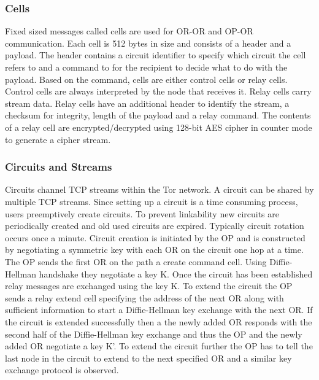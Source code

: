 \documentclass{llncs}
\begin{document}
\subsubsection{Cells}
Fixed sized messages called cells are used for OR-OR and OP-OR communication. Each cell is 512 bytes in size and consists of a header and a payload. The header contains a circuit identifier to specify which circuit the cell refers to and a command to for the recipient to decide what to do with the payload.
Based on the command, cells are either control cells or relay cells. Control cells are always interpreted by the node that receives it. Relay cells carry stream data. Relay cells have an additional header to identify the stream, a checksum for integrity, length of the payload and a relay command. The contents of a relay cell are encrypted/decrypted using 128-bit AES cipher in counter mode to generate a cipher stream.

\subsubsection{Circuits and Streams}
Circuits channel TCP streams within the Tor network. A circuit can be shared by multiple TCP streams. Since setting up a circuit is a time consuming process, users preemptively create circuits. To prevent linkability new circuits are periodically created and old used circuits are expired. Typically circuit rotation occurs once a minute. Circuit creation is initiated by the OP and is constructed by negotiating a symmetric key with each OR on the circuit one hop at a time. The OP sends the first OR on the path a create command cell. Using Diffie-Hellman handshake they negotiate a key K. Once the circuit has been established relay messages are exchanged using the key K. To extend the circuit the OP sends a relay extend cell specifying the address of the next OR along with sufficient information to start a Diffie-Hellman key exchange with the next OR. If the circuit is extended successfully then a the newly added OR responds with the second half of the Diffie-Hellman key exchange and thus the OP and the newly added OR negotiate a key K'. To extend the circuit further the OP has to tell the last node in the circuit to extend to the next specified OR and a similar key exchange protocol is observed.
\end{document}
